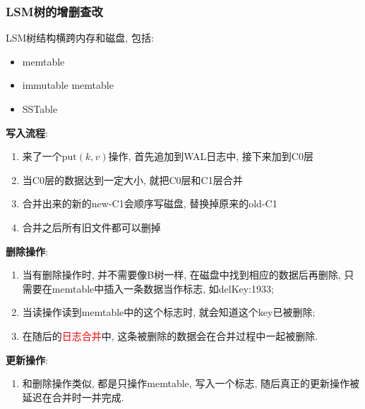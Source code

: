 \subsubsection{LSM树的增删查改}

LSM树结构横跨内存和磁盘, 包括:
\begin{itemize}
    \item memtable
    \item immutable memtable
    \item SSTable
\end{itemize}

\textbf{写入流程}:
\begin{enumerate}
    \item 来了一个$\text{put}(k,v)$操作, 首先追加到WAL日志中, 接下来加到C0层
    \item 当C0层的数据达到一定大小, 就把C0层和C1层合并
    \item 合并出来的新的new-C1会顺序写磁盘, 替换掉原来的old-C1
    \item 合并之后所有旧文件都可以删掉
\end{enumerate}

\textbf{删除操作}:
\begin{enumerate}
    \item 当有删除操作时, 并不需要像B树一样, 在磁盘中找到相应的数据后再删除, 只需要在memtable中插入一条数据当作标志, 如delKey:1933;
    \item 当读操作读到memtable中的这个标志时, 就会知道这个key已被删除;
    \item 在随后的\textcolor{red}{日志合并}中, 这条被删除的数据会在合并过程中一起被删除.
\end{enumerate}

\textbf{更新操作}:
\begin{enumerate}
    \item 和删除操作类似, 都是只操作memtable, 写入一个标志, 随后真正的更新操作被延迟在合并时一并完成.
\end{enumerate}

